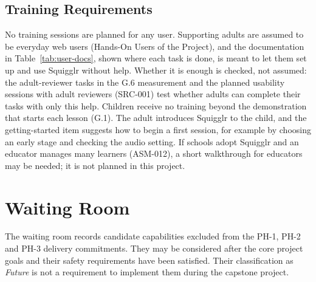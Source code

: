 \documentclass[12pt]{article}
\renewcommand{\_}{\textunderscore\allowbreak}%
\begin{document}
\subsection{Training Requirements}
No training sessions are planned for any user. Supporting adults are assumed to
be everyday web users (Hands-On Users of the Project), and the documentation in
Table~\ref{tab:user-docs}, shown where each task is done, is meant to let them
set up and use Squigglr without help. Whether it is enough is checked, not
assumed: the adult-reviewer tasks in the G.6 measurement and the planned
usability sessions with adult reviewers (SRC-001) test whether adults can
complete their tasks with only this help. Children receive no training beyond
the demonstration that starts each lesson (G.1). The adult introduces Squigglr
to the child, and the getting-started item suggests how to begin a first
session, for example by choosing an early stage and checking the audio setting.
If schools adopt Squigglr and an educator manages many learners (ASM-012), a
short walkthrough for educators may be needed; it is not planned in this
project.

\section{Waiting Room}
\label{sec:waiting-room}

The waiting room records candidate capabilities excluded from the PH-1, PH-2 and
PH-3 delivery commitments. They may be considered after the core project goals
and their safety requirements have been satisfied. Their classification as
\emph{Future} is not a requirement to implement them during the capstone
project.
\end{document}

